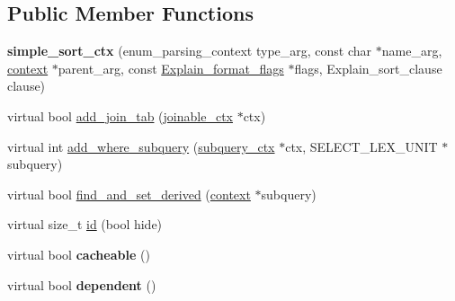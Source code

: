 \subsection*{Public Member Functions}
\begin{DoxyCompactItemize}
\item 
\mbox{\label{classopt__explain__json__namespace_1_1simple__sort__ctx_a4a94663185b480ec3fab687086d886e7}} 
{\bfseries simple\+\_\+sort\+\_\+ctx} (enum\+\_\+parsing\+\_\+context type\+\_\+arg, const char $\ast$name\+\_\+arg, \mbox{\hyperlink{classopt__explain__json__namespace_1_1context}{context}} $\ast$parent\+\_\+arg, const \mbox{\hyperlink{classExplain__format__flags}{Explain\+\_\+format\+\_\+flags}} $\ast$flags, Explain\+\_\+sort\+\_\+clause clause)
\item 
virtual bool \mbox{\hyperlink{classopt__explain__json__namespace_1_1simple__sort__ctx_abfe9f7f76b32e211f5c70f3023aaba63}{add\+\_\+join\+\_\+tab}} (\mbox{\hyperlink{classopt__explain__json__namespace_1_1joinable__ctx}{joinable\+\_\+ctx}} $\ast$ctx)
\item 
virtual int \mbox{\hyperlink{classopt__explain__json__namespace_1_1simple__sort__ctx_a334cf6e47221f587df9e1012819cf19d}{add\+\_\+where\+\_\+subquery}} (\mbox{\hyperlink{classopt__explain__json__namespace_1_1subquery__ctx}{subquery\+\_\+ctx}} $\ast$ctx, S\+E\+L\+E\+C\+T\+\_\+\+L\+E\+X\+\_\+\+U\+N\+IT $\ast$subquery)
\item 
virtual bool \mbox{\hyperlink{classopt__explain__json__namespace_1_1simple__sort__ctx_ae6d87919605c73b23b177c042b0935be}{find\+\_\+and\+\_\+set\+\_\+derived}} (\mbox{\hyperlink{classopt__explain__json__namespace_1_1context}{context}} $\ast$subquery)
\item 
virtual size\+\_\+t \mbox{\hyperlink{classopt__explain__json__namespace_1_1simple__sort__ctx_aa375936b99b0a0bfa29fdd30f1eb860c}{id}} (bool hide)
\item 
\mbox{\label{classopt__explain__json__namespace_1_1simple__sort__ctx_a51df4f2b1315f332fcf1b231aebb4ca5}} 
virtual bool {\bfseries cacheable} ()
\item 
\mbox{\label{classopt__explain__json__namespace_1_1simple__sort__ctx_a559dee8015cada8d503745ce9b5c4d72}} 
virtual bool {\bfseries dependent} ()
\end{DoxyCompactItemize}
